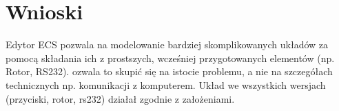 \documentclass[wide,a4paper,titlepage,12pt] {article}
\begin{document}
  \paragraph{}
  \newpage
  \section{Wnioski}
  Edytor ECS pozwala na modelowanie bardziej skomplikowanych układów za pomocą składania ich z prostszych, wcześniej przygotowanych elementów (np. Rotor, RS232). ozwala to skupić się na istocie problemu, a nie na szczegółach technicznych np. komunikacji z komputerem. Układ we wszystkich wersjach (przyciski, rotor, rs232) działał zgodnie z założeniami.
\end{document}
